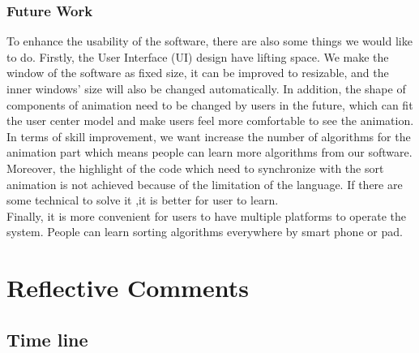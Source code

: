 \documentclass[paper=a4, fontsize=11pt,twoside]{scrartcl}		%
\begin{document}
\subsubsection{Future Work}
To enhance the usability of the software, there are also some things we would like to do. Firstly, the User Interface (UI) design have lifting space. We make the window of the software as fixed size, it can be improved to resizable, and the inner windows' size will also be changed automatically. In addition, the shape of components of animation need to be changed by users in the future, which can fit the user center model and make users feel more comfortable to see the animation.\\
\newline
In terms of skill improvement, we want increase the number of algorithms for the animation part which means people can learn more algorithms from our software. Moreover, the highlight of the code which need to synchronize with the sort animation is not achieved because of the limitation of the language. If there are some technical to solve it ,it is better for user to learn.\\
\newline
Finally, it is more convenient for users to have multiple platforms to operate the system. People can learn sorting algorithms everywhere by smart phone or pad.



\section{Reflective Comments}
\subsection{Time line}\\
\end{document}
